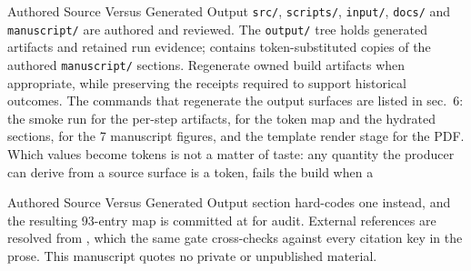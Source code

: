 \documentclass[
  ignorenonframetext,
]{beamer}
\begin{document}
\begin{frame}{Authored Source Versus Generated
Output}
\protect{}\label{authored-source-versus-generated-output}
\texttt{src/}, \texttt{scripts/}, \texttt{input/}, \texttt{docs/} and
\texttt{manuscript/} are authored and reviewed. The \texttt{output/}
tree holds generated artifacts and retained run evidence;
 contains token-substituted copies of the
authored \texttt{manuscript/} sections. Regenerate owned build artifacts
when appropriate, while preserving the receipts required to support
historical outcomes. The commands that regenerate the output surfaces
are listed in sec.~6: the smoke run for the
per-step artifacts,
 for the token map
and the hydrated sections, 
for the 7 manuscript figures, and the template render stage for the PDF.
Which values become tokens is not a matter of taste: any quantity the
producer can derive from a source surface is a token,
 fails the build when a
\end{frame}

\begin{frame}{Authored Source Versus Generated
Output}
section hard-codes one instead, and the resulting 93-entry map is
committed at  for audit.
External references are resolved from
, which the same gate cross-checks
against every citation key in the prose. This manuscript quotes no
private or unpublished material.
\end{frame}
\end{document}

